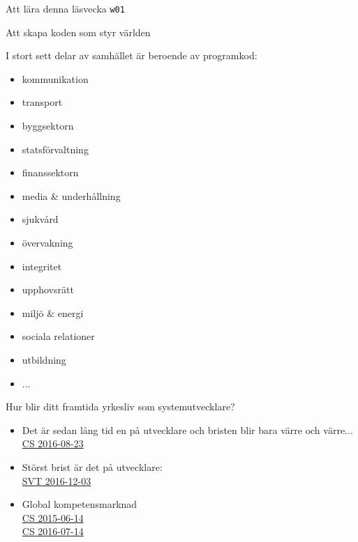 


\ifkompendium\else  %
\begin{Slide}{Att lära denna läsvecka \texttt{w01}}

\end{Slide}
\fi


\ifkompendium\else  %

\begin{Slide}{Att skapa koden som styr världen}
\begin{multicols}{2}\footnotesize
I stort sett  delar av samhället är beroende av programkod:
\begin{itemize}\scriptsize
\item kommunikation
\item transport
\item byggsektorn
\item statsförvaltning
\item finanssektorn
\item media \& underhållning
\item sjukvård
\item övervakning
\item integritet
\item upphovsrätt
\item miljö \& energi
\item sociala relationer
\item utbildning
\item ...
\end{itemize}
\columnbreak %
Hur blir ditt framtida yrkesliv som systemutvecklare?
\begin{itemize}
\item  Det är sedan lång tid en  på utvecklare och bristen blir bara värre och värre... \\
  \href{http://computersweden.idg.se/2.2683/1.663879/oppen-kallkod-brist-kompetens}{CS 2016-08-23}

\item Störst brist är det på  utvecklare: \\
\href{https://www.svt.se/nyheter/inrikes/stor-brist-pa-programmerare-kvinnor-lockas-till-yrket}{SVT 2016-12-03}
\item Global kompetensmarknad \\
  \href{http://computersweden.idg.se/2.2683/1.630901/det-finns-programmerare-och-sa-finns-det-programmerare}{CS 2015-06-14} \\
  \href{http://computersweden.idg.se/2.2683/1.662186/25-miljoner-utvecklare?queryText=miljoner\%20utvecklare}{CS 2016-07-14 }
\end{itemize}
\end{multicols}
\end{Slide}

